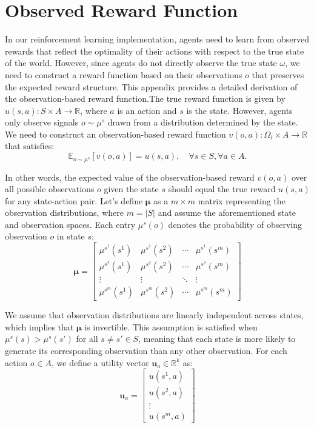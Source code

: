 \documentclass[a4paper,12pt]{report}
\begin{document}
\section{Observed Reward Function}
\label{appendix:observed_reward_derivation} In our reinforcement learning
implementation, agents need to learn from observed rewards that reflect the optimality
of their actions with respect to the true state of the world. However, since agents
do not directly observe the true state $\omega$, we need to construct a reward
function based on their observations $o$ that preserves the expected reward
structure. This appendix provides a detailed derivation of the observation-based
reward function.The true reward function is given by $u(s, a): S \times A \rightarrow
    \mathbb{R}$, where $a$ is an action and $s$ is the state. However, agents only
observe signals $o \sim \mu^{s}$ drawn from a distribution determined by the
state. We need to construct an observation-based reward function $v(o, a): \Omega
    _{i} \times A \rightarrow \mathbb{R}$ that satisfies:
\begin{equation}
    \mathbb{E}_{o \sim \mu^{s}}[v(o, a)] = u(s, a), \quad \forall s \in S, \forall
    a \in A.
\end{equation}

In other words, the expected value of the observation-based reward $v(o, a)$
over all possible observations $o$ given the state $s$ should equal the true
reward $u(s, a)$ for any state-action pair. Let's define $\bm{\mu}$ as a $m \times
    m$ matrix representing the observation distributions, where $m = |S|$ and assume
the aforementioned state and observation spaces. Each entry $\mu^{s}(o)$ denotes
the probability of observing observation $o$ in state $s$:
\begin{equation}
    \bm{\mu}=
    \begin{bmatrix}
        \mu^{s^1}(s^{1}) & \mu^{s^1}(s^{2}) & \cdots & \mu^{s^1}(s^{m}) \\
        \mu^{s^2}(s^{1}) & \mu^{s^2}(s^{2}) & \cdots & \mu^{s^2}(s^{m}) \\
        \vdots           & \vdots           & \ddots & \vdots           \\
        \mu^{s^m}(s^{1}) & \mu^{s^m}(s^{2}) & \cdots & \mu^{s^m}(s^{m})
    \end{bmatrix}
\end{equation}

We assume that observation distributions are linearly independent across states,
which implies that $\bm{\mu}$ is invertible. This assumption is satisfied when $\mu
    ^{s}(s) > \mu^{s}(s')$ for all $s \neq s' \in S$, meaning that each state is
more likely to generate its corresponding observation than any other observation.
For each action $a \in A$, we define a utility vector
$\bm{u}_{a} \in \mathbb{R}^{k}$ as:
\begin{equation}
    \bm{u}_{a} =
    \begin{bmatrix}
        u(s^{1}, a) \\
        u(s^{2}, a) \\
        \vdots      \\
        u(s^{m}, a)
    \end{bmatrix}
\end{equation}
\end{document}
